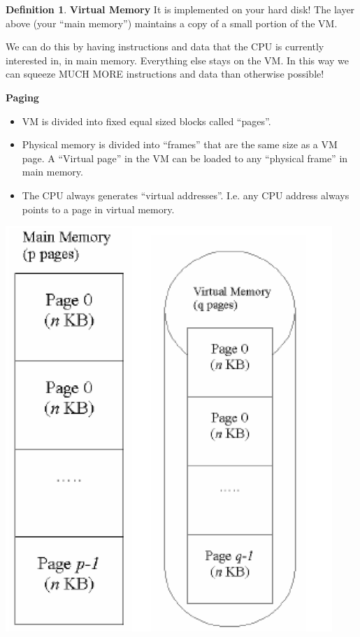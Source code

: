 \documentclass[11pt,a4paper]{article}
\theoremstyle{definition}
\newtheorem{definition}{Definition}[section]
\newenvironment{myitemize}
{ \begin{itemize}
    \setlength{\itemsep}{5pt}
    \setlength{\parskip}{0pt}
    \setlength{\parsep}{0pt}     }
{ \end{itemize}                  }
\begin{document}
\begin{definition}{\textbf{Virtual Memory}}
	It is implemented on your hard disk! The layer above (your ``main memory'') maintains a copy of a small portion of the VM.
	
	We can do this by having instructions and data that the CPU is currently interested in, in main memory. Everything else stays on the VM. In this way we can squeeze MUCH MORE instructions and data than otherwise possible!
	
	\textbf{Paging}
	
	\begin{minipage}{0.5\linewidth}
		\begin{myitemize}
			\item VM is divided into fixed equal sized blocks called ``pages''. 
			\item Physical memory is divided into ``frames'' that are the same size as a VM page. A ``Virtual page'' in the VM can be loaded to any ``physical frame''  in main memory.
			\item The CPU always generates ``virtual addresses''. I.e. any CPU address always points to a page in virtual memory.
		\end{myitemize}
\end{minipage}
\begin{minipage}{0.25\linewidth}
	\includegraphics[width=1\linewidth]{m5/paging}

\end{minipage}
\end{definition}
\end{document}
